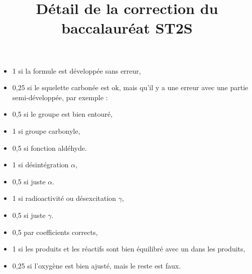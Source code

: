 \title{Détail de la correction du baccalauréat ST2S}
\maketitle



\bigskip
{}

\begin{multicols}{2}
\numeroQuestion 
\begin{itemize} 
  \item 1 si la formule est développée sans erreur,
  \item 0,25 si le squelette carbonée est ok, mais qu'il y a une erreur avec une partie semi-développée, par exemple :
  \begin{center}
  \end{center}
\end{itemize}

\numeroQuestion 
\begin{itemize}
  \item 0,5 si le groupe est bien entouré,
  \item 1 si groupe carbonyle,
  \item 0,5 si fonction aldéhyde.
\end{itemize}

\numeroQuestion 
\begin{itemize}
  \item 1 si désintégration $\alpha$,
  \item 0,5 si juste $\alpha$.
\end{itemize}

\numeroQuestion  
\begin{itemize}
  \item 1 si radioactivité ou désexcitation $\gamma$,
  \item 0,5 si juste $\gamma$.
\end{itemize}

\numeroQuestion 
\begin{itemize}
  \item 0,5 par coefficients corrects,
  \item 1 si les produits et les réactifs sont bien équilibré avec un  dans les produits,
  \item 0,25 si l'oxygène est bien ajusté, mais le reste est faux.
\end{itemize}


\end{multicols}
